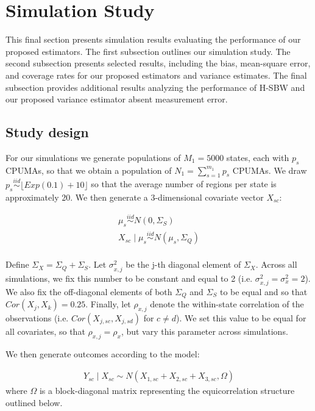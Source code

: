 \section{Simulation Study}\label{app:simstudy}

This final section presents simulation results evaluating the performance of our proposed estimators. The first subsection outlines our simulation study. The second subsection presents selected results, including the bias, mean-square error, and coverage rates for our proposed estimators and variance estimates. The final subsection provides additional results analyzing the performance of H-SBW and our proposed variance estimator absent measurement error.

\subsection{Study design}

For our simulations we generate populations of $M_1 = 5000$ states, each with $p_s$ CPUMAs, so that we obtain a population of $N_1 = \sum_{s=1}^{m_1} p_s$ CPUMAs. We draw $p_s \stackrel{iid}\sim \lfloor Exp(0.1) + 10\rfloor$ so that the average number of regions per state is approximately 20. We then generate a 3-dimensional covariate vector $X_{sc}$:

\begin{align*}
\mu_s \stackrel{iid}\sim N(0, \Sigma_S) \\
X_{sc} \mid \mu_s \stackrel{iid}\sim N(\mu_s, \Sigma_Q) \\
\end{align*}

Define $\Sigma_X = \Sigma_Q + \Sigma_S$. Let $\sigma^2_{x, j}$ be the j-th diagonal element of $\Sigma_X$. Across all simulations, we fix this number to be constant and equal to 2 (i.e. $\sigma^2_{x, j} = \sigma^2_x = 2$). We also fix the off-diagonal elements of both $\Sigma_Q$ and $\Sigma_S$ to be equal and so that $Cor(X_j, X_k) = 0.25$. Finally, let $\rho_{x, j}$ denote the within-state correlation of the observations (i.e. $Cor(X_{j, sc}, X_{j, sd})$ for $c \ne d$). We set this value to be equal for all covariates, so that $\rho_{x, j} = \rho_x$, but vary this parameter across simulations.

We then generate outcomes according to the model:

\begin{align*}
Y_{sc} \mid X_{sc} \sim N(X_{1, sc} + X_{2, sc} + X_{3, sc}, \Omega)
\end{align*}
%
where $\Omega$ is a block-diagonal matrix representing the equicorrelation structure outlined below.

